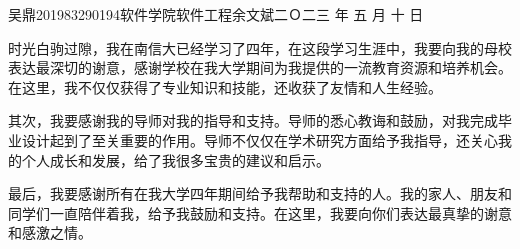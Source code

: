 \documentclass[a4paper]{nuist}
\begin{document}
{吴鼎}{201983290194}{软件学院}{软件工程}{余文斌}{二Ｏ二三\hspace{0.4em} 年\hspace{0.4em} 五\hspace{0.4em} 月\hspace{0.4em} 十\hspace{0.4em} 日}

\mytableofcontents












\clearpage

\thanking
{
    时光白驹过隙，我在南信大已经学习了四年，在这段学习生涯中，我要向我的母校表达最深切的谢意，感谢学校在我大学期间为我提供的一流教育资源和培养机会。在这里，我不仅仅获得了专业知识和技能，还收获了友情和人生经验。

    其次，我要感谢我的导师对我的指导和支持。导师的悉心教诲和鼓励，对我完成毕业设计起到了至关重要的作用。导师不仅仅在学术研究方面给予我指导，还关心我的个人成长和发展，给了我很多宝贵的建议和启示。
    
    最后，我要感谢所有在我大学四年期间给予我帮助和支持的人。我的家人、朋友和同学们一直陪伴着我，给予我鼓励和支持。在这里，我要向你们表达最真挚的谢意和感激之情。
}
\end{document}
